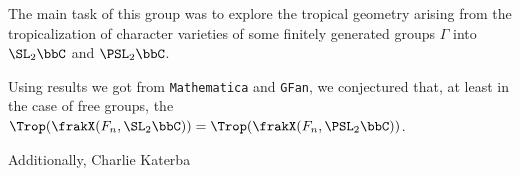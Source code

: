 \begin{frame}
  The main task of this group was to explore the tropical geometry arising
  from the tropicalization of character varieties of some finitely
  generated groups $\Gamma$ into $\SL_2\bbC$ and $\PSL_2\bbC$.%

  \pause%

  Using results we got from \texttt{Mathematica} and \texttt{GFan}, we
  conjectured that, at least in the case of free groups, the
  $\Trop(\frakX(F_n,\SL_2\bbC))=\Trop(\frakX(F_n,\PSL_2\bbC))$.%

  Additionally, Charlie Katerba
\end{frame}

